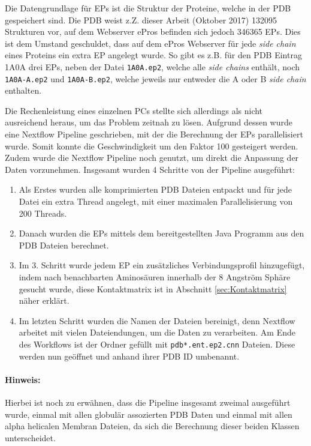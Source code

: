 Die Datengrundlage für \ac{EP}s ist die Struktur der Proteine, welche in der \ac{PDB} gespeichert sind. Die \ac{PDB} weist z.Z. dieser Arbeit (Oktober 2017) 132095 Strukturen vor, auf dem Webserver ePros befinden sich jedoch 346365 \ac{EP}s. Dies ist dem Umstand geschuldet, dass auf dem ePros Webserver für jede \emph{side chain} eines Proteins ein extra \ac{EP} angelegt wurde. So gibt es z.B. für den \ac{PDB} Eintrag 1A0A drei \ac{EP}s, neben der Datei \texttt{1A0A.ep2}, welche alle \emph{side chains} enthält, noch \texttt{1A0A-A.ep2} und \texttt{1A0A-B.ep2}, welche jeweils nur entweder die A oder B \emph{side chain} enthalten.

Die Rechenleistung eines einzelnen PCs stellte sich allerdings als nicht ausreichend heraus, um das Problem zeitnah zu lösen. Aufgrund dessen wurde eine Nextflow Pipeline geschrieben, mit der die Berechnung der \ac{EP}s  parallelisiert wurde. Somit konnte die Geschwindigkeit um den Faktor 100 gesteigert werden. Zudem wurde die Nextflow Pipeline noch genutzt, um direkt die Anpassung der Daten vorzunehmen. Insgesamt wurden 4 Schritte von der Pipeline ausgeführt:

\begin{enumerate}
    \item
        Als Erstes wurden alle komprimierten \ac{PDB} Dateien entpackt und für jede Datei ein extra Thread angelegt, mit einer maximalen Parallelisierung von 200 Threads.
    \item 
        Danach wurden die \ac{EP}s  mittels dem bereitgestellten Java Programm aus den \ac{PDB} Dateien berechnet.
    \item
        Im 3. Schritt wurde jedem \ac{EP} ein zusätzliches Verbindungsprofil hinzugefügt, indem nach benachbarten Aminosäuren innerhalb der 8 Angström Sphäre gesucht wurde, diese Kontaktmatrix ist in Abschnitt \ref{sec:Kontaktmatrix} näher erklärt.
    \item
        Im letzten Schritt wurden die Namen der Dateien bereinigt, denn Nextflow arbeitet mit vielen Dateiendungen, um die Daten zu verarbeiten. Am Ende des Workflows ist der Ordner gefüllt mit \texttt{pdb*.\-ent.\-ep2.\-cnn} Dateien. Diese werden nun geöffnet und anhand ihrer \ac{PDB} ID umbenannt.
\end{enumerate}

\paragraph{Hinweis:} Hierbei ist noch zu erwähnen, dass die Pipeline insgesamt zweimal ausgeführt wurde, einmal mit allen globulär assozierten \ac{PDB} Daten und einmal mit allen alpha helicalen Membran Dateien, da sich die Berechnung dieser beiden Klassen unterscheidet.

